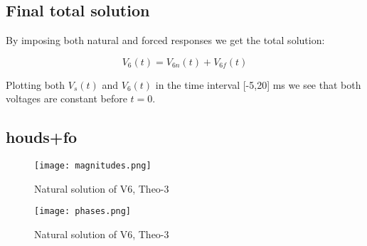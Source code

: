 \subsection{Final total solution} 
By imposing both natural and forced responses we get the total solution: 

\begin{equation}
  V_6(t)= V_{6n}(t) + V_{6f}(t)
  \label{}
\end{equation}    

Plotting both $V_s(t)$ and $V_6(t)$ in the time interval [-5,20] ms we see that both voltages are constant before $t=0$.


\subsection {houds+fo} 


\FloatBarrier
\begin{figure}
  \texttt{[image: magnitudes.png]}
  \caption{Natural solution of V6, Theo-3}
  \label{fig:magnitudes}
\end{figure}

\begin{figure}
  \texttt{[image: phases.png]}
  \caption{Natural solution of V6, Theo-3}
  \label{fig:phases}
\end{figure}
\FloatBarrier





%    

%   
